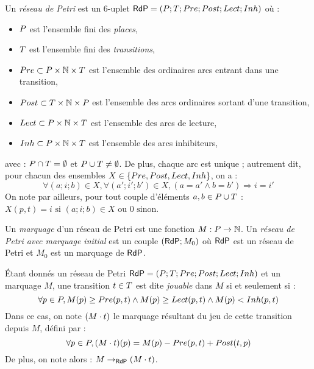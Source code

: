\begin{definition}
  Un \emph{réseau de Petri} est un 6-uplet
  $\mathsf{RdP} = (P; T; Pre; Post; Lect; Inh)$ où :
  \begin{itemize}
    \item $P$ est l'ensemble fini des \emph{places},
    \item $T$ est l'ensemble fini des \emph{transitions},
    \item $Pre \subset P \times \mathbb{N} \times T$
      est l'ensemble des ordinaires arcs entrant dans une transition,
    \item $Post \subset T \times \mathbb{N} \times P$
      est l'ensemble des arcs ordinaires sortant d'une transition,
    \item $Lect \subset P \times \mathbb{N} \times T$ est l'ensemble des arcs de lecture,
    \item $Inh \subset P \times \mathbb{N} \times T$ est l'ensemble des arcs inhibiteurs,
  \end{itemize}
  avec : $P \cap T = \emptyset$ et $P \cup T \neq \emptyset$.
  De plus, chaque arc est unique ; autrement dit, pour chacun des ensembles
  $X \in \{ Pre, Post, Lect, Inh \}$, on a :
  \[\forall (a; i; b) \in X, \forall (a'; i'; b') \in X,
    (a = a' \wedge b = b') \Rightarrow i = i'\]
  On note par ailleurs, pour tout couple d'éléments $a, b \in P \cup T$ :
  $X(p, t) = i \text{ si } (a; i; b) \in X \text{ ou } 0 \text{ sinon}$.
  
  Un \emph{marquage} d'un réseau de Petri est une fonction $M : P \rightarrow \mathbb{N}$.
  Un \emph{réseau de Petri avec marquage initial} est un couple $(\mathsf{RdP}; M_0)$
  où $\mathsf{RdP}$ est un réseau de Petri et $M_0$ est un marquage de $\mathsf{RdP}$.
%   
\end{definition}

\begin{definition}
  Étant donnés un réseau de Petri $\mathsf{RdP} = (P; T; Pre; Post; Lect; Inh)$
  et un marquage $M$,
  une transition $t \in T$ est dite \emph{jouable} dans $M$ si et seulement si :
  \[\forall p \in P, M(p) \geq Pre(p, t) \wedge M(p) \geq Lect(p, t)
    \wedge M(p) < Inh(p, t)\]
  Dans ce cas, on note $(M \cdot t)$ le marquage résultant du jeu de cette transition depuis $M$,
  défini par :
  \[\forall p \in P, (M \cdot t)(p) = M(p) - Pre(p, t) + Post(t, p)\]
  De plus, on note alors : $M \rightarrow_{\mathsf{RdP}} (M \cdot t)$.
\end{definition}

